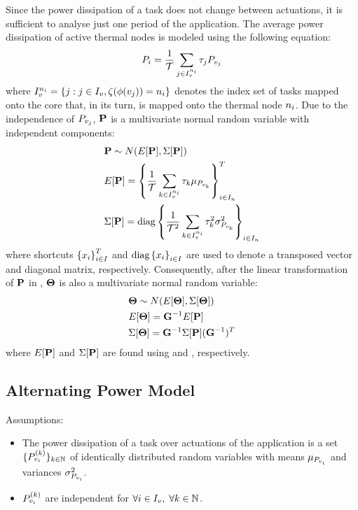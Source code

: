 Since the power dissipation of a task does not change between actuations, it is sufficient to analyse just one period of the application. The average power dissipation of active thermal nodes is modeled using the following equation:
\begin{equation} \equlabel{node-power}
  \power_i = \frac{1}{\period} \sum_{j \in \taskindex^{\node_i}} \executiontime_j \power_{\task_j}
\end{equation}
where $I_v^{n_i} = \{ j: j \in I_v, \zeta(\phi(v_j)) = n_i \}$ denotes the index set of tasks mapped onto the core that, in its turn, is mapped onto the thermal node $n_i$. Due to the independence of $P_{v_j}$, $\mathbf{P}$ is a multivariate normal random variable with independent components:
\begin{align}
  & \vpower \sim \normal(\expectation{\vpower}, \covariance{\vpower}) \nonumber \\
  & \expectation{\vpower} = \vector{ \frac{1}{\period} \sum_{k \in \taskindex^{\node_i}} \executiontime_k \mean{\power_{\task_k}} }^T_{i \in \nodeindex} \equlabel{steady-power-mean} \\
  & \covariance{\vpower} = \diagonal{\frac{1}{\period^2} \sum_{k \in \taskindex^{\node_i}} \executiontime_k^2 \deviation{\power_{\task_k}}^2}_{i \in \nodeindex} \equlabel{steady-power-covariance}
\end{align}
where shortcuts $\left\{x_i\right\}^T_{i \in I}$ and $\text{diag}\left\{x_i\right\}_{i \in I}$ are used to denote a transposed vector and diagonal matrix, respectively. Consequently, after the linear transformation of $\mathbf{P}$ in , $\mathbf{\Theta}$ is also a multivariate normal random variable:
\begin{align*}
  & \mathbf{\Theta} \sim N(E[\mathbf{\Theta}], \Sigma[\mathbf{\Theta}]) \\
  & E[\mathbf{\Theta}] = \mathbf{G}^{-1} E[\mathbf{P}] \\
  & \Sigma[\mathbf{\Theta}] = \mathbf{G}^{-1} \Sigma[\mathbf{P}] (\mathbf{G}^{-1})^T
\end{align*}
where $E[\mathbf{P}]$ and $\Sigma[\mathbf{P}]$ are found using  and , respectively.

\subsection{Alternating Power Model} 
Assumptions:
\begin{itemize}
  \item The power dissipation of a task over actuations of the application is a set $\{ P^{(k)}_{v_i} \}_{k \in \mathbb{N}}$ of identically distributed random variables with means $\mu_{P_{v_i}}$ and variances $\sigma_{P_{v_i}}^2$.
  \item $P^{(k)}_{v_i}$ are independent for $\forall i \in I_v, \; \forall k \in \mathbb{N}$.
\end{itemize}

